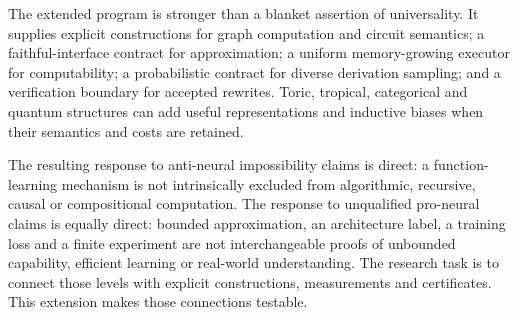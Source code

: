 The extended program is stronger than a blanket assertion of universality. It supplies explicit constructions for graph computation and circuit semantics; a faithful-interface contract for approximation; a uniform memory-growing executor for computability; a probabilistic contract for diverse derivation sampling; and a verification boundary for accepted rewrites. Toric, tropical, categorical and quantum structures can add useful representations and inductive biases when their semantics and costs are retained.

The resulting response to anti-neural impossibility claims is direct: a function-learning mechanism is not intrinsically excluded from algorithmic, recursive, causal or compositional computation. The response to unqualified pro-neural claims is equally direct: bounded approximation, an architecture label, a training loss and a finite experiment are not interchangeable proofs of unbounded capability, efficient learning or real-world understanding. The research task is to connect those levels with explicit constructions, measurements and certificates. This extension makes those connections testable.
